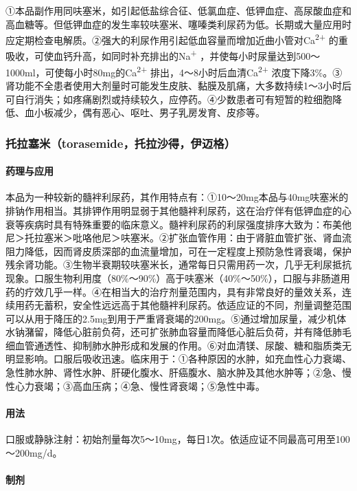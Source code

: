 ①本品副作用同呋塞米，如引起低盐综合征、低氯血症、低钾血症、高尿酸血症和高血糖等。但低钾血症的发生率较呋塞米、噻嗪类利尿药为低。长期或大量应用时应定期检查电解质。②强大的利尿作用引起低血容量而增加近曲小管对Ca\textsuperscript{2+}
的重吸收，可使血钙升高，如同时补充排出的Na\textsuperscript{+}
，并使每小时尿量达到500～1000ml，可使每小时80mg的Ca\textsuperscript{2+}
排出，4～8小时后血清Ca\textsuperscript{2+}
浓度下降3\%。③肾功能不全患者使用大剂量时可能发生皮肤、黏膜及肌痛，大多数持续1～3小时后可自行消失；如疼痛剧烈或持续较久，应停药。④少数患者可有短暂的粒细胞降低、血小板减少，偶有恶心、呕吐、男子乳房发育、皮疹等。

\subsubsection{托拉塞米（torasemide，托拉沙得，伊迈格）}

\paragraph{药理与应用}

本品为一种较新的髓袢利尿药，其作用特点有：①10～20mg本品与40mg呋塞米的排钠作用相当。其排钾作用明显弱于其他髓袢利尿药，这在治疗伴有低钾血症的心衰等疾病时具有特殊重要的临床意义。髓袢利尿药的利尿强度排序大致为：布美他尼＞托拉塞米＞吡咯他尼＞呋塞米。②扩张血管作用：由于肾脏血管扩张、肾血流阻力降低，因而肾皮质深部的血流量增加，可在一定程度上预防急性肾衰竭，保护残余肾功能。③生物半衰期较呋塞米长，通常每日只需用药一次，几乎无利尿抵抗现象。口服生物利用度（80\%～90\%）高于呋塞米（40\%～50\%），口服与非肠道用药的疗效几乎一样。④在相当大的治疗剂量范围内，具有非常良好的量效关系，连续用药无蓄积，安全性远远高于其他髓袢利尿药。依适应证的不同，剂量调整范围可以从用于降压的2.5mg到用于严重肾衰竭的200mg。⑤通过增加尿量，减少机体水钠潴留，降低心脏前负荷，还可扩张肺血容量而降低心脏后负荷，并有降低肺毛细血管通透性、抑制肺水肿形成和发展的作用。⑥对血清镁、尿酸、糖和脂质类无明显影响。口服后吸收迅速。临床用于：①各种原因的水肿，如充血性心力衰竭、急性肺水肿、肾性水肿、肝硬化腹水、肝癌腹水、脑水肿及其他水肿等；②急、慢性心力衰竭；③高血压病；④急、慢性肾衰竭；⑤急性中毒。

\paragraph{用法}

口服或静脉注射：初始剂量每次5～10mg，每日1次。依适应证不同最高可用至100～200mg/d。

\paragraph{制剂}

